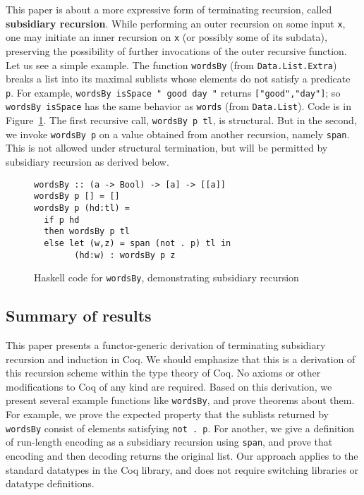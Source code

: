 \documentclass[a4paper,USenglish]{lipics-v2021}
\begin{document}
This paper is about a more expressive form of terminating recursion,
called \textbf{subsidiary recursion}.  While performing an outer
recursion on some input \verb|x|, one may initiate an inner recursion
on \verb|x| (or possibly some of its subdata), preserving the
possibility of further invocations of the outer recursive function.
Let us see a simple example.  The function \verb|wordsBy|
(from \verb|Data.List.Extra|) breaks a list into its maximal
sublists whose elements do not satisfy a predicate \verb|p|.  For
example, \verb|wordsBy isSpace " good day "| returns
\verb|["good","day"]|; so \verb|wordsBy isSpace| has the same behavior
as \verb|words| (from \verb|Data.List|).  Code is in
Figure~\ref{fig:wordsBy}. The first recursive call,
\verb|wordsBy p tl|, is structural.  But in the second, we invoke
\verb|wordsBy p| on a value obtained from another recursion, namely
\verb|span|.  This is not allowed under structural termination,
but will be permitted by subsidiary recursion as derived below.

\begin{figure}
\begin{verbatim}
wordsBy :: (a -> Bool) -> [a] -> [[a]]
wordsBy p [] = []
wordsBy p (hd:tl) =
  if p hd
  then wordsBy p tl 
  else let (w,z) = span (not . p) tl in
        (hd:w) : wordsBy p z
\end{verbatim}
\caption{Haskell code for \texttt{wordsBy}, demonstrating subsidiary recursion}
\label{fig:wordsBy}
\end{figure}

\subsection{Summary of results}

This paper presents a functor-generic derivation of terminating
subsidiary recursion and induction in Coq.  We should emphasize that
this is a derivation of this recursion scheme within the type theory
of Coq.  No axioms or other modifications to Coq of any kind are
required. Based on this derivation, we present several example
functions like \verb|wordsBy|, and prove theorems about them.  For
example, we prove the expected property that the sublists returned by
\verb|wordsBy| consist of elements satisfying \verb|not . p|.
For another, we give a definition of run-length encoding as a
subsidiary recursion using \verb|span|, and prove that encoding and
then decoding returns the original list.  Our approach applies to the
standard datatypes in the Coq library, and does not require switching
libraries or datatype definitions.
\end{document}
